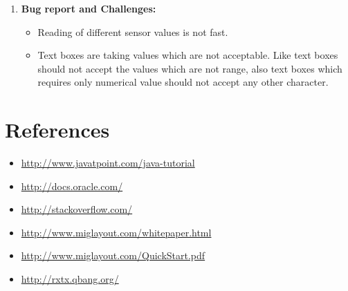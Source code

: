 \documentclass[a4paper,12pt,oneside]{book}
\begin{document}
\begin{enumerate}
\item \textbf{\large Bug report and Challenges:}
\begin{itemize}
    \item Reading of different sensor values is not fast.
	\item Text boxes are taking values which are not acceptable. Like text boxes should not accept the values which are not range, also text boxes which requires only numerical value should not accept any other character.
\end{itemize} 

\end{enumerate} 
\newpage
\section*{References}
\begin{itemize}
    \item \href {http://www.javatpoint.com/java-tutorial}{http://www.javatpoint.com/java-tutorial}
	\item \href {http://docs.oracle.com/}{http://docs.oracle.com/}
	\item \href {http://stackoverflow.com/}{http://stackoverflow.com/}
	\item \href {http://www.miglayout.com/whitepaper.html}{http://www.miglayout.com/whitepaper.html}
	\item \href {http://www.miglayout.com/QuickStart.pdf}{http://www.miglayout.com/QuickStart.pdf}
	\item \href {http://rxtx.qbang.org/}{http://rxtx.qbang.org/}
\end{itemize}
\end{document}
